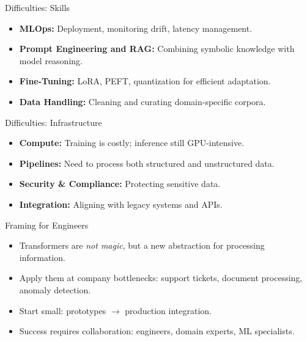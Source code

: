 \documentclass{beamer}
\begin{document}

\begin{frame}{Difficulties: Skills}
\begin{itemize}
    \item \textbf{MLOps:} Deployment, monitoring drift, latency management.
    \item \textbf{Prompt Engineering and RAG:} Combining symbolic knowledge with model reasoning.
    \item \textbf{Fine-Tuning:} LoRA, PEFT, quantization for efficient adaptation.
    \item \textbf{Data Handling:} Cleaning and curating domain-specific corpora.
\end{itemize}
\end{frame}


\begin{frame}{Difficulties: Infrastructure}
\begin{itemize}
    \item \textbf{Compute:} Training is costly; inference still GPU-intensive.
    \item \textbf{Pipelines:} Need to process both structured and unstructured data.
    \item \textbf{Security \& Compliance:} Protecting sensitive data.
    \item \textbf{Integration:} Aligning with legacy systems and APIs.
\end{itemize}
\end{frame}


\begin{frame}{Framing for Engineers}
\begin{itemize}
    \item Transformers are \emph{not magic}, but a new abstraction for processing information.
    \item Apply them at company bottlenecks: support tickets, document processing, anomaly detection.
    \item Start small: prototypes $\rightarrow$ production integration.
    \item Success requires collaboration: engineers, domain experts, ML specialists.
\end{itemize}
\end{frame}

\end{document}
